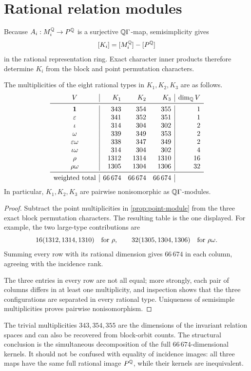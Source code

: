 \section{Rational relation modules}
\label{sec:modules}

Because \(A_i:M_i^\mathbb Q\to P^\mathbb Q\) is a surjective
\(\mathbb Q\Gamma\)-map, semisimplicity gives
\[
 [K_i]=[M_i^\mathbb Q]-[P^\mathbb Q]
\]
in the rational representation ring.  Exact character inner products
therefore determine \(K_i\) from the block and point permutation
characters.

\begin{proposition}
\label{prop:relation-table}
The multiplicities of the eight rational types in \(K_1,K_2,K_3\) are as
follows.
\[
\begin{array}{c|rrr|r}
V&K_1&K_2&K_3&\dim_{\QQ}V\\
\midrule
\mathbf1 &343&354&355&1\\
\eps     &341&352&351&1\\
\iot     &314&304&302&2\\
\om      &339&349&353&2\\
\eps\om  &338&347&349&2\\
\iot\om  &314&304&302&4\\
\rh      &1312&1314&1310&16\\
\rh\om   &1305&1304&1306&32\\
\midrule
\multicolumn{1}{r|}{\text{weighted total}}
&66\,674&66\,674&66\,674&
\end{array}
\]
In particular, \(K_1,K_2,K_3\) are pairwise nonisomorphic as
\(\mathbb Q\Gamma\)-modules.
\end{proposition}

\begin{proof}
Subtract the point multiplicities in \cref{prop:point-module} from the
three exact block permutation characters.  The resulting table is the
one displayed.  For example, the two large-type contributions are
\[
 16(1312,1314,1310)\quad\text{for }\rho,
 \qquad
 32(1305,1304,1306)\quad\text{for }\rho\omega.
\]
Summing every row with its rational dimension
gives \(66\,674\) in each column, agreeing with the incidence rank.

The three entries in every row are not all equal; more strongly, each
pair of columns differs in at least one multiplicity, and inspection shows
that the three configurations are separated in every rational type.
Uniqueness of semisimple multiplicities proves pairwise
nonisomorphism.
\end{proof}

\begin{remark}
The trivial multiplicities \(343,354,355\) are the dimensions of the
invariant relation spaces and can also be recovered from block-orbit
counts.  The structural conclusion is the simultaneous decomposition of
the full \(66\,674\)-dimensional kernels.  It should not be confused with
equality of incidence images: all three maps have the same full rational
image \(P^\mathbb Q\), while their kernels are inequivalent.
\end{remark}

